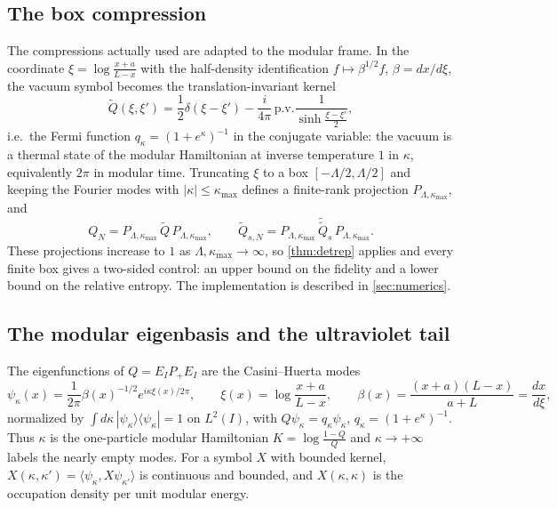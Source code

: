 \subsection{The box compression}\label{sec:box}
The compressions actually used are adapted to the modular frame.  In the
coordinate $\xi=\log\frac{x+a}{L-x}$ with the half-density identification
$f\mapsto\beta^{1/2}f$, $\beta=dx/d\xi$, the vacuum symbol becomes the
translation-invariant kernel
\begin{equation}\label{eq:thermal-kernel}
 \widetilde Q(\xi,\xi')=\frac12\delta(\xi-\xi')
 -\frac i{4\pi}\,\mathrm{p.v.}\frac1{\sinh\frac{\xi-\xi'}2},
\end{equation}
i.e.\ the Fermi function $q_\kappa=(1+e^\kappa)^{-1}$ in the conjugate variable:
the vacuum is a thermal state of the modular Hamiltonian at inverse temperature
$1$ in $\kappa$, equivalently $2\pi$ in modular time.  Truncating $\xi$ to a box
$[-\Lambda/2,\Lambda/2]$ and keeping the Fourier modes with
$|\kappa|\le\kappa_{\max}$ defines a finite-rank projection $P_{\Lambda,
\kappa_{\max}}$, and
\begin{equation}\label{eq:Qbox}
 Q_N=P_{\Lambda,\kappa_{\max}}\,\widetilde Q\,P_{\Lambda,\kappa_{\max}},
 \qquad
 \widetilde Q_{s,N}=P_{\Lambda,\kappa_{\max}}\,\widetilde{\widetilde Q}_s\,
 P_{\Lambda,\kappa_{\max}} .
\end{equation}
These projections increase to $1$ as $\Lambda,\kappa_{\max}\to\infty$, so
\cref{thm:detrep} applies and every finite box gives a two-sided control: an upper
bound on the fidelity and a lower bound on the relative entropy.  The
implementation is described in \cref{sec:numerics}.

\subsection{The modular eigenbasis and the ultraviolet tail}
The eigenfunctions of $Q=E_IP_+E_I$ are the Casini--Huerta modes \cite{CH}
\begin{equation}\label{eq:modes}
 \psi_\kappa(x)=\frac1{2\pi}\beta(x)^{-1/2}e^{i\kappa\xi(x)/2\pi},\qquad
 \xi(x)=\log\frac{x+a}{L-x},\qquad
 \beta(x)=\frac{(x+a)(L-x)}{a+L}=\frac{dx}{d\xi},
\end{equation}
normalized by $\int d\kappa\,|\psi_\kappa\rangle\langle\psi_\kappa|=1$ on $L^2(I)$,
with $Q\psi_\kappa=q_\kappa\psi_\kappa$, $q_\kappa=(1+e^\kappa)^{-1}$.  Thus
$\kappa$ is the one-particle modular Hamiltonian $K=\log\frac{1-Q}Q$ and
$\kappa\to+\infty$ labels the nearly empty modes.  For a symbol $X$ with bounded
kernel, $X(\kappa,\kappa')=\langle\psi_\kappa,X\psi_{\kappa'}\rangle$ is continuous
and bounded, and $X(\kappa,\kappa)$ is the occupation density per unit modular
energy.


